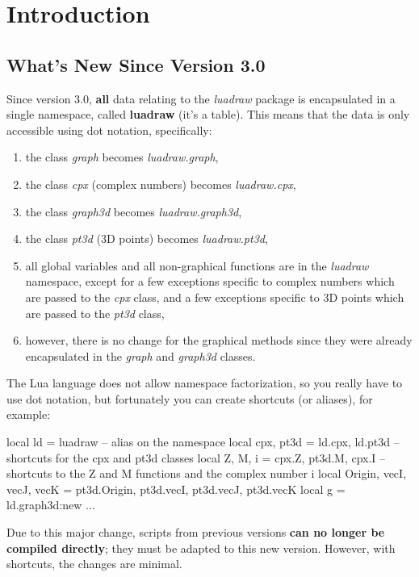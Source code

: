 \section{Introduction}

\subsection{What's New Since Version 3.0}

Since version 3.0, \textbf{all} data relating to the \emph{luadraw} package is encapsulated in a single namespace, called \textbf{luadraw} (it's a table). This means that the data is only accessible using dot notation, specifically:

\begin{enumerate}
    \item the class \emph{graph} becomes \emph{luadraw.graph},
    \item the class \emph{cpx} (complex numbers) becomes \emph{luadraw.cpx},
    \item the class \emph{graph3d} becomes \emph{luadraw.graph3d},
    \item the class \emph{pt3d} (3D points) becomes \emph{luadraw.pt3d},
    \item all global variables and all non-graphical functions are in the \emph{luadraw} namespace, except for a few exceptions specific to complex numbers which are passed to the \emph{cpx} class, and a few exceptions specific to 3D points which are passed to the \emph{pt3d} class,
    \item however, there is no change for the graphical methods since they were already encapsulated in the \emph{graph} and \emph{graph3d} classes.
\end{enumerate}

The Lua language does not allow namespace factorization, so you really have to use dot notation, but fortunately you can create shortcuts (or aliases), for example:

\begin{Luacode}
local ld = luadraw -- alias on the namespace
local cpx, pt3d = ld.cpx, ld.pt3d -- shortcuts for the cpx and pt3d classes
local Z, M, i = cpx.Z, pt3d.M, cpx.I -- shortcuts to the Z and M functions and the complex number i
local Origin, vecI, vecJ, vecK = pt3d.Origin, pt3d.vecI, pt3d.vecJ, pt3d.vecK
local g = ld.graph3d:new{}
...
\end{Luacode}

Due to this major change, scripts from previous versions \textbf{can no longer be compiled directly}; they must be adapted to this new version. However, with shortcuts, the changes are minimal.

